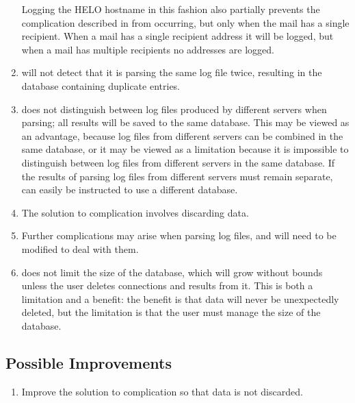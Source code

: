 \begin{enumerate}
        Logging the HELO hostname in this fashion also partially prevents
        the complication described in  from occurring, but only when the mail has a
        single recipient.  When a mail has a single recipient address it
        will be logged, but when a mail has multiple recipients no
        addresses are logged.

    \item \parsername{} will not detect that it is parsing the same log file
        twice, resulting in the database containing duplicate entries.

    \item \parsername{} does not distinguish between log files produced by
        different servers when parsing; all results will be saved to the
        same database.  This may be viewed as an advantage, because log
        files from different servers can be combined in the same database,
        or it may be viewed as a limitation because it is impossible to
        distinguish between log files from different servers in the same
        database.  If the results of parsing log files from different
        servers must remain separate, \parsername{} can easily be
        instructed to use a different database.

    \item The solution to complication  involves discarding data.

    \item Further complications may arise when parsing log files, and
        \parsername{} will need to be modified to deal with them.

    \item \parsername{} does not limit the size of the database, which will
        grow without bounds unless the user deletes connections and results
        from it.  This is both a limitation and a benefit: the benefit is
        that data will never be unexpectedly deleted, but the limitation is
        that the user must manage the size of the database.

\end{enumerate}

\subsection{Possible Improvements}

\begin{enumerate}

    \item Improve the solution to complication  so that data is not discarded.

\end{enumerate}


